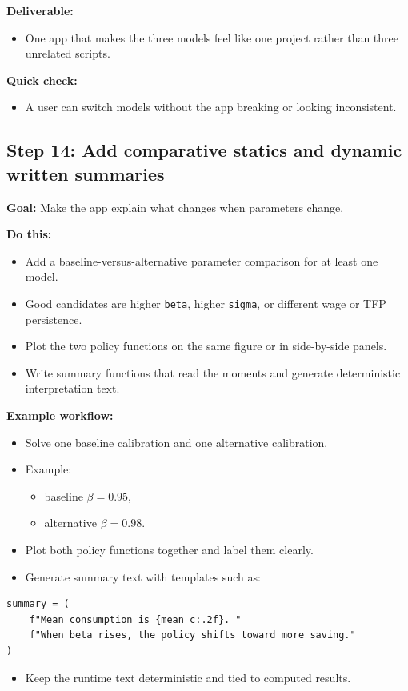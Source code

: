\documentclass[11pt]{article}
\begin{document}
\textbf{Deliverable:}
\begin{itemize}
    \item One app that makes the three models feel like one project rather than three unrelated scripts.
\end{itemize}

\textbf{Quick check:}
\begin{itemize}
    \item A user can switch models without the app breaking or looking inconsistent.
\end{itemize}

\subsection{Step 14: Add comparative statics and dynamic written summaries}
\textbf{Goal:} Make the app explain what changes when parameters change.

\textbf{Do this:}
\begin{itemize}
    \item Add a baseline-versus-alternative parameter comparison for at least one model.
    \item Good candidates are higher \verb|beta|, higher \verb|sigma|, or different wage or TFP persistence.
    \item Plot the two policy functions on the same figure or in side-by-side panels.
    \item Write summary functions that read the moments and generate deterministic interpretation text.
\end{itemize}

\textbf{Example workflow:}
\begin{itemize}
    \item Solve one baseline calibration and one alternative calibration.
    \item Example:
    \begin{itemize}
        \item baseline \(\beta = 0.95\),
        \item alternative \(\beta = 0.98\).
    \end{itemize}
    \item Plot both policy functions together and label them clearly.
    \item Generate summary text with templates such as:
\end{itemize}
\begin{lstlisting}
summary = (
    f"Mean consumption is {mean_c:.2f}. "
    f"When beta rises, the policy shifts toward more saving."
)
\end{lstlisting}
\begin{itemize}
    \item Keep the runtime text deterministic and tied to computed results.
\end{itemize}
\end{document}
